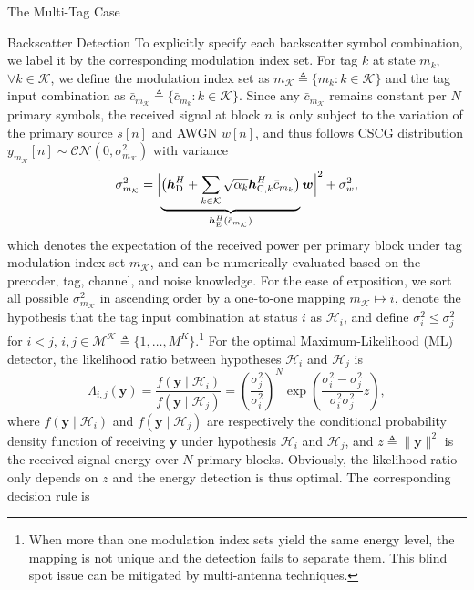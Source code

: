 \documentclass[journal]{IEEEtran}
\begin{document}
\begin{section}{The Multi-Tag Case}
\begin{subsection}{Backscatter Detection}
			To explicitly specify each backscatter symbol combination, we label it by the corresponding modulation index set. For tag $k$ at state $m_k$, $\forall k \in \mathcal{K}$, we define the modulation index set as $m_{\mathcal{K}} \triangleq \{m_k : k \in \mathcal{K}\}$ and the tag input combination as $\bar{c}_{m_{\mathcal{K}}} \triangleq \{\bar{c}_{m_k} : k \in \mathcal{K}\}$. Since any $\bar{c}_{m_{\mathcal{K}}}$ remains constant per $N$ primary symbols, the received signal at block $n$ is only subject to the variation of the primary source $s[n]$ and AWGN $w[n]$, and thus follows CSCG distribution $y_{m_{\mathcal{K}}}[n] \sim \mathcal{CN}\left(0,\sigma_{m_{\mathcal{K}}}^2\right)$ with variance
			\begin{equation}
				\sigma_{m_{\mathcal{K}}}^2 = \Bigl\lvert \underbrace{\bigl(\boldsymbol{h}_{\mathrm{D}}^H + \sum_{k \in \mathcal{K}} \sqrt{\alpha_k} \boldsymbol{h}_{\mathrm{C},k}^H \bar{c}_{m_k}\bigr)}_{\boldsymbol{h}_{\mathrm{E}}^H(\bar{c}_{m_{\mathcal{K}}})} \boldsymbol{w} \Bigr\rvert^2 + \sigma_w^2,
				\label{eq:receive_variance}
			\end{equation}
			which denotes the expectation of the received power per primary block under tag modulation index set $m_{\mathcal{K}}$, and can be numerically evaluated based on the precoder, tag, channel, and noise knowledge. For the ease of exposition, we sort all possible $\sigma_{m_{\mathcal{K}}}^2$ in ascending order by a one-to-one mapping $m_{\mathcal{K}} \mapsto i$, denote the hypothesis that the tag input combination at status $i$ as $\mathcal{H}_i$, and define $\sigma_i^2 \le \sigma_j^2$ for $i < j$, $i,j \in \mathcal{M^K} \triangleq \{1,\ldots,M^K\}$.\footnote{When more than one modulation index sets yield the same energy level, the mapping is not unique and the detection fails to separate them. This blind spot issue can be mitigated by multi-antenna techniques.} For the optimal Maximum-Likelihood (ML) detector, the likelihood ratio between hypotheses $\mathcal{H}_i$ and $\mathcal{H}_j$ is \cite{Qian2019}
			\begin{equation}
				\Lambda_{i,j}(\boldsymbol{y}) = \frac{f(\boldsymbol{y} \mid \mathcal{H}_i)}{f(\boldsymbol{y} \mid \mathcal{H}_j)} = \left( \frac{\sigma_j^2}{\sigma_i^2} \right)^N \exp \left( \frac{\sigma_i^2 - \sigma_j^2}{\sigma_i^2 \sigma_j^2} z \right),
				\label{eq:likelihood_ratio}
			\end{equation}
			where $f(\boldsymbol{y} \mid \mathcal{H}_i)$ and $f(\boldsymbol{y} \mid \mathcal{H}_j)$ are respectively the conditional probability density function of receiving $\boldsymbol{y}$ under hypothesis $\mathcal{H}_i$ and $\mathcal{H}_j$, and $z \triangleq \lVert \boldsymbol{y} \rVert^2$ is the received signal energy over $N$ primary blocks. Obviously, the likelihood ratio only depends on $z$ and the energy detection is thus optimal. The corresponding decision rule is

\end{subsection}
\end{section}
\end{document}
